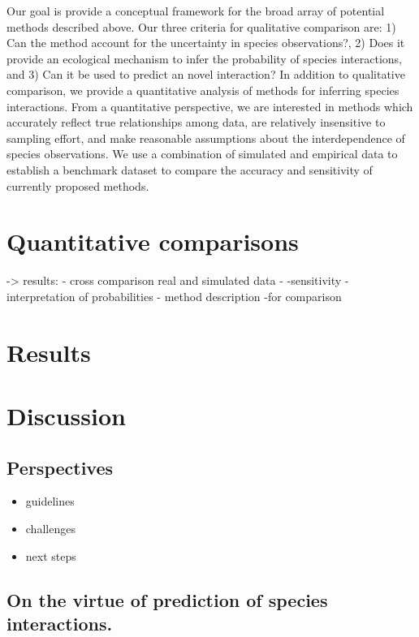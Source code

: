 Our goal is provide a conceptual framework for the broad array of potential
methods described above. Our three criteria for qualitative comparison are: 1)
Can the method account for the uncertainty in species observations?, 2) Does it
provide an ecological mechanism to infer the probability of species
interactions, and 3) Can it be used to predict an novel interaction? In addition
to qualitative comparison, we provide a quantitative analysis of methods for
inferring species interactions. From a quantitative perspective, we are
interested in methods which accurately reflect true relationships among data,
are relatively insensitive to sampling effort, and make reasonable assumptions
about the interdependence of species observations. We use a combination of
simulated and empirical data to establish a benchmark dataset to compare the
accuracy and sensitivity of currently proposed methods.

\section{Quantitative comparisons}\label{quantitative-comparisons}

-\textgreater{} results: - cross comparison \textbar{} real and simulated data -
-sensitivity \textbar{} - interpretation of probabilities - method description
-for comparison

\section{Results}\label{results}

\section{Discussion}\label{discussion}

\subsection{Perspectives}\label{perspectives}

\begin{itemize} \item guidelines \item challenges \item next steps \end{itemize}

\subsection{On the virtue of prediction of species
interactions.}\label{on-the-virtue-of-prediction-of-species-interactions.}

